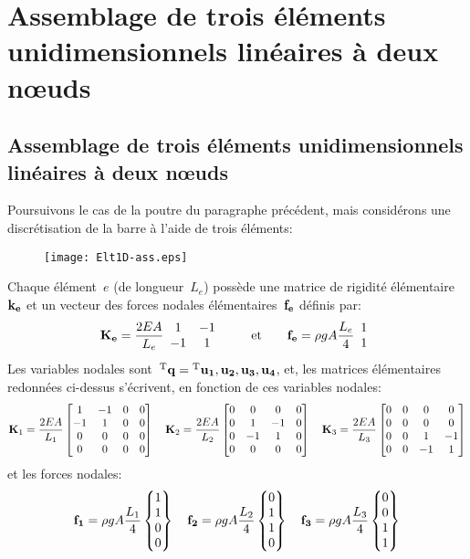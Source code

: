   \section{Assemblage de trois éléments unidimensionnels linéaires à deux nœuds}\label{Sec-ass}
\else
  \subsection{Assemblage de trois éléments unidimensionnels linéaires à deux nœuds}\label{Sec-ass}
\fi
Poursuivons le cas de la poutre du paragraphe précédent, mais considérons une discrétisation
de la barre à l'aide de trois éléments:
\begin{figure}[ht]\centering
\texttt{[image: Elt1D-ass.eps]}
\end{figure}
\medskipvm
Chaque élément~$e$ (de longueur~$L_e$) possède une matrice de rigidité élémentaire~$\MM{k_e}$ 
et un vecteur des forces nodales élémentaires~$\VV{f_e}$ définis par:
\begin{equation}
\MM{K_e} = \frac{2EA}{L_e} \MM{\begin{array}{cc} 1 & -1\\ -1& 1 \end{array}}
\qquad \text{ et} \qquad
\VV{f_e} = \rho g A \frac{L_e}4 \VV{\begin{array}{c} 1 \\1 \end{array}}
\end{equation}
\medskipvm
Les variables nodales sont~${}^\mathrm{T}\mathbf{q}={}^\mathrm{T}\mathbf{u_1, u_2, u_3, u_4}$, et, les matrices élémentaires
redonnées ci-dessus s'écrivent, en fonction de ces variables nodales:
\begin{equation*}
\MM{K}_1 = \frac{2EA}{L_1} \MM*{1 & -1 & 0 & 0\\ -1& 1 & 0 & 0\\ 0&0&0&0\\0&0&0&0}
\quad
\MM{K}_2 = \frac{2EA}{L_2} \MM*{0&0&0&0\\ 0& 1 & -1 & 0\\ 0 & -1& 1& 0\\0&0&0&0}
\quad
\MM{K}_3 = \frac{2EA}{L_3} \MM*{0&0&0&0\\0&0&0&0\\0& 0& 1 & -1\\ 0&0 & -1& 1}
\end{equation*}
et les forces nodales:
\begin{equation*}
\VV{f_1} = \rho g A \frac{L_1}4 \VV*{1 \\1\\0\\0}
\quad
\VV{f_2} = \rho g A \frac{L_2}4 \VV*{0\\1 \\1\\0}
\quad
\VV{f_3} = \rho g A \frac{L_3}4 \VV*{0\\0\\1 \\1}
\end{equation*}
